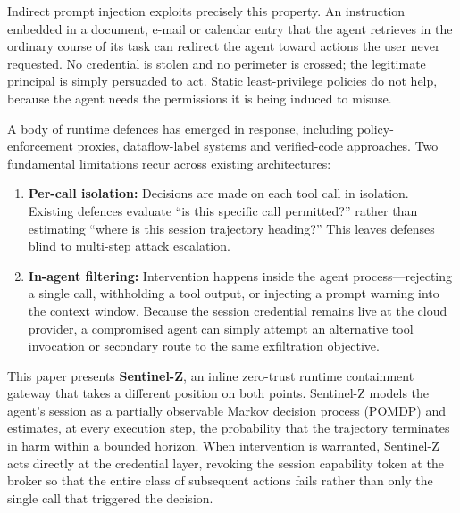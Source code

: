 \documentclass[conference]{IEEEtran}
\begin{document}
Indirect prompt injection exploits precisely this property. An instruction embedded in a document, e-mail or calendar entry that the agent retrieves in the ordinary course of its task can redirect the agent toward actions the user never requested. No credential is stolen and no perimeter is crossed; the legitimate principal is simply persuaded to act. Static least-privilege policies do not help, because the agent needs the permissions it is being induced to misuse.

A body of runtime defences has emerged in response, including policy-enforcement proxies, dataflow-label systems and verified-code approaches. Two fundamental limitations recur across existing architectures:
\begin{enumerate}
    \item \textbf{Per-call isolation:} Decisions are made on each tool call in isolation. Existing defences evaluate ``is this specific call permitted?'' rather than estimating ``where is this session trajectory heading?'' This leaves defenses blind to multi-step attack escalation.
    \item \textbf{In-agent filtering:} Intervention happens inside the agent process---rejecting a single call, withholding a tool output, or injecting a prompt warning into the context window. Because the session credential remains live at the cloud provider, a compromised agent can simply attempt an alternative tool invocation or secondary route to the same exfiltration objective.
\end{enumerate}

This paper presents \textbf{Sentinel-Z}, an inline zero-trust runtime containment gateway that takes a different position on both points. Sentinel-Z models the agent's session as a partially observable Markov decision process (POMDP) and estimates, at every execution step, the probability that the trajectory terminates in harm within a bounded horizon. When intervention is warranted, Sentinel-Z acts directly at the credential layer, revoking the session capability token at the broker so that the entire class of subsequent actions fails rather than only the single call that triggered the decision.
\end{document}
